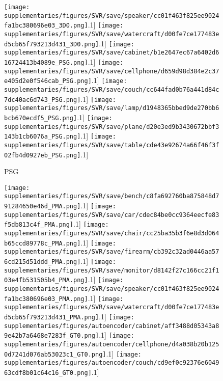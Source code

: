 \documentclass[10pt,twocolumn,letterpaper]{article}
\begin{document}
\begin{figure*}[t!]
\begin{subfigure}[b]{0.24\linewidth}
 \texttt{[image: supplementaries/figures/SVR/save/speaker/cc01f463f825ee9024fa1bc380696e03\_3D0.png]}\0.1\linewidth]
 \texttt{[image: supplementaries/figures/SVR/save/watercraft/d00fe7ce177483ed5cb65f793213d431\_3D0.png]}\0.1\linewidth]
 \texttt{[image: supplementaries/figures/SVR/save/cabinet/b1e2647ec67a6402d616724413b4089e\_PSG.png]}\0.1\linewidth]
 \texttt{[image: supplementaries/figures/SVR/save/cellphone/d659d98d384e2c37e405d2e0f546cab\_PSG.png]}\0.1\linewidth]
 \texttt{[image: supplementaries/figures/SVR/save/couch/cc644fad0b76a441d84c7dc40ac6d743\_PSG.png]}\0.1\linewidth]
 \texttt{[image: supplementaries/figures/SVR/save/lamp/d1948365bbed9de270bb6bcb670ecdf5\_PSG.png]}\0.1\linewidth]
 \texttt{[image: supplementaries/figures/SVR/save/plane/d20e3ed9b3430672bbf3143b1cb6076a\_PSG.png]}\0.1\linewidth]
 \texttt{[image: supplementaries/figures/SVR/save/table/cde43e92674a66f46f3f02fb4d0927eb\_PSG.png]}\0.1\linewidth]
\caption{PSG}
\end{subfigure}
\begin{subfigure}[b]{0.24\linewidth}
\centering
 \texttt{[image: supplementaries/figures/SVR/save/bench/c8fa692760ba875848d791284650e46d\_PMA.png]}\0.1\linewidth]
 \texttt{[image: supplementaries/figures/SVR/save/car/cdec84be0cc9364eecfe83f5db813c4f\_PMA.png]}\0.1\linewidth]
 \texttt{[image: supplementaries/figures/SVR/save/chair/cc25ba35b3f6e8d3d064b65ccd89778c\_PMA.png]}\0.1\linewidth]
 \texttt{[image: supplementaries/figures/SVR/save/firearm/cb392c32ad0446aa576cd215d51ddd\_PMA.png]}\0.1\linewidth]
 \texttt{[image: supplementaries/figures/SVR/save/monitor/d8142f27c166cc21f103e4fb531505b4\_PMA.png]}\0.1\linewidth]
 \texttt{[image: supplementaries/figures/SVR/save/speaker/cc01f463f825ee9024fa1bc380696e03\_PMA.png]}\0.1\linewidth]
 \texttt{[image: supplementaries/figures/SVR/save/watercraft/d00fe7ce177483ed5cb65f793213d431\_PMA.png]}\0.1\linewidth]
 \texttt{[image: supplementaries/figures/autoencoder/cabinet/aff3488d05343a89e42b7a6468e7283f\_GT0.png]}\0.1\linewidth]
 \texttt{[image: supplementaries/figures/autoencoder/cellphone/d4a038b20b1250d7241d076ab53023c1\_GT0.png]}\0.1\linewidth]
 \texttt{[image: supplementaries/figures/autoencoder/couch/cd9ef0c92376e604963cdf8b01c64c16\_GT0.png]}\0.1\linewidth]

\end{subfigure}
\end{figure*}
\end{document}
